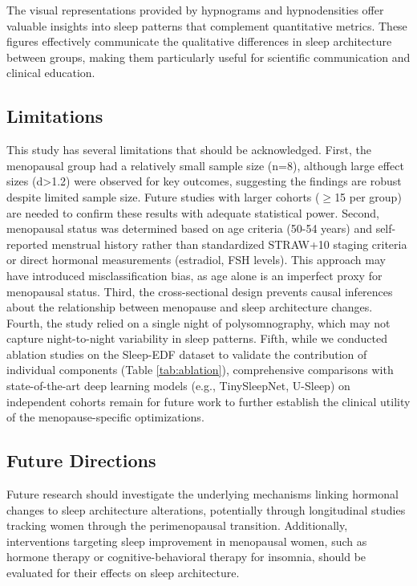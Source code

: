 \documentclass[ASNA,twocolumn]{USG}
\begin{document}
The visual representations provided by hypnograms and hypnodensities offer valuable insights into sleep patterns that complement quantitative metrics. These figures effectively communicate the qualitative differences in sleep architecture between groups, making them particularly useful for scientific communication and clinical education.

\subsection{Limitations}

This study has several limitations that should be acknowledged. First, the menopausal group had a relatively small sample size (n=8), although large effect sizes (d>1.2) were observed for key outcomes, suggesting the findings are robust despite limited sample size. Future studies with larger cohorts ($\geq$15 per group) are needed to confirm these results with adequate statistical power. Second, menopausal status was determined based on age criteria (50-54 years) and self-reported menstrual history rather than standardized STRAW+10 staging criteria or direct hormonal measurements (estradiol, FSH levels). This approach may have introduced misclassification bias, as age alone is an imperfect proxy for menopausal status. Third, the cross-sectional design prevents causal inferences about the relationship between menopause and sleep architecture changes. Fourth, the study relied on a single night of polysomnography, which may not capture night-to-night variability in sleep patterns. Fifth, while we conducted ablation studies on the Sleep-EDF dataset to validate the contribution of individual components (Table \ref{tab:ablation}), comprehensive comparisons with state-of-the-art deep learning models (e.g., TinySleepNet, U-Sleep) on independent cohorts remain for future work to further establish the clinical utility of the menopause-specific optimizations.

\subsection{Future Directions}

Future research should investigate the underlying mechanisms linking hormonal changes to sleep architecture alterations, potentially through longitudinal studies tracking women through the perimenopausal transition. Additionally, interventions targeting sleep improvement in menopausal women, such as hormone therapy or cognitive-behavioral therapy for insomnia, should be evaluated for their effects on sleep architecture.
\end{document}
